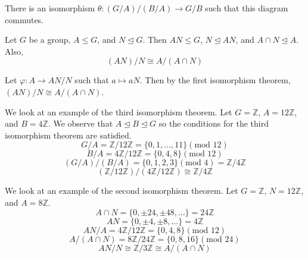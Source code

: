 \documentclass{mathnotes}
\begin{document}
\begin{prop}
  There is an isomorphism $\theta:(G/A)/(B/A)\to G/B$ such that this diagram
  commutes.
  \begin{center}
  \end{center}
\end{prop}

\begin{bthm}
  Let $G$ be a group, $A\le G$, and $N\unlhd G$. Then $AN\le G$, $N\unlhd AN$,
  and $A\cap N\unlhd A$. Also, $$(AN)/N\cong A/(A\cap N)$$
\end{bthm}

\begin{bpf}
  Let $\varphi:A\to AN/N$ such that $a\mapsto aN$. Then by the first
  isomorphism theorem, $(AN)/N\cong A/(A\cap N)$.
\end{bpf}

\begin{ex}
  We look at an example of the third isomorphism theorem. Let $G=\mathbb{Z}$,
  $A=12\mathbb{Z}$, and $B=4\mathbb{Z}$. We observe that $A\unlhd B\unlhd G$ so
  the conditions for the third isomorphism theorem are satisfied.
  $$G/A=\mathbb{Z}/12\mathbb{Z}=\{0,1,\ldots,11\}(\text{mod }12)$$
  $$B/A=4\mathbb{Z}/12\mathbb{Z}=\{0,4,8\}(\text{mod }12)$$
  $$(G/A)/(B/A)=\{0,1,2,3\}(\text{mod }4)=\mathbb{Z}/4\mathbb{Z}$$
  $$(\mathbb{Z}/12\mathbb{Z})/(4\mathbb{Z}/12\mathbb{Z})
  \cong\mathbb{Z}/4\mathbb{Z}$$
\end{ex}

\begin{ex}
  We look at an example of the second isomorphism theorem. Let $G=\mathbb{Z}$,
  $N=12\mathbb{Z}$, and $A=8\mathbb{Z}$.
  $$A\cap N=\{0,\pm24,\pm48,\ldots\}=24\mathbb{Z}$$
  $$AN=\{0,\pm4,\pm8,\ldots\}=4\mathbb{Z}$$
  $$AN/A=4\mathbb{Z}/12\mathbb{Z}=\{0,4,8\}(\text{mod }12)$$
  $$A/(A\cap N)=8\mathbb{Z}/24\mathbb{Z}
  =\{0,8,16\}(\text{mod }24)$$
  $$AN/N\cong\mathbb{Z}/3\mathbb{Z}\cong A/(A\cap N)$$
\end{ex}
\end{document}
